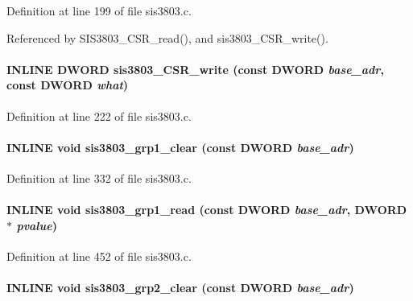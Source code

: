 Definition at line 199 of file sis3803.c.

Referenced by SIS3803\_\-CSR\_\-read(), and sis3803\_\-CSR\_\-write().
\paragraph[{sis3803\_\-CSR\_\-write}]{\setlength{\rightskip}{0pt plus 5cm}INLINE {\bf DWORD} sis3803\_\-CSR\_\-write (const {\bf DWORD} {\em base\_\-adr}, \/  const {\bf DWORD} {\em what})}\hfill\label{sis3803_8c_adc257689853158728bceec30e72dd50e}


Definition at line 222 of file sis3803.c.
\paragraph[{sis3803\_\-grp1\_\-clear}]{\setlength{\rightskip}{0pt plus 5cm}INLINE void sis3803\_\-grp1\_\-clear (const {\bf DWORD} {\em base\_\-adr})}\hfill\label{sis3803_8c_a9e9a28f4066a48cf2f64906313957432}


Definition at line 332 of file sis3803.c.
\paragraph[{sis3803\_\-grp1\_\-read}]{\setlength{\rightskip}{0pt plus 5cm}INLINE void sis3803\_\-grp1\_\-read (const {\bf DWORD} {\em base\_\-adr}, \/  {\bf DWORD} $\ast$ {\em pvalue})}\hfill\label{sis3803_8c_a50a4bb2410f0285e043c7055c5fed1b8}


Definition at line 452 of file sis3803.c.
\paragraph[{sis3803\_\-grp2\_\-clear}]{\setlength{\rightskip}{0pt plus 5cm}INLINE void sis3803\_\-grp2\_\-clear (const {\bf DWORD} {\em base\_\-adr})}\hfill\label{sis3803_8c_a706b211604f0a6c618dc8a653406c299}


